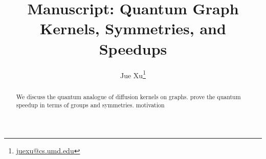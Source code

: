 \documentclass[11pt]{article}
\title{Manuscript: Quantum Graph Kernels, Symmetries, and Speedups}
\author{Jue Xu\footnote{\href{mailto:juexu@cs.umd.edu}{ juexu@cs.umd.edu}} }
\theoremstyle{plain}
\theoremstyle{definition}
\begin{document}
\maketitle
\begin{abstract}
	We discuss the quantum analogue of diffusion kernels on graphs. prove the quantum speedup in terms of groups and symmetries.
	motivation
\end{abstract}

\setcounter{tocdepth}{2}
\tableofcontents


% 
% 
% 
% 
% 
% 
% 
% 





% 
% 
% 
% 
\end{document}
